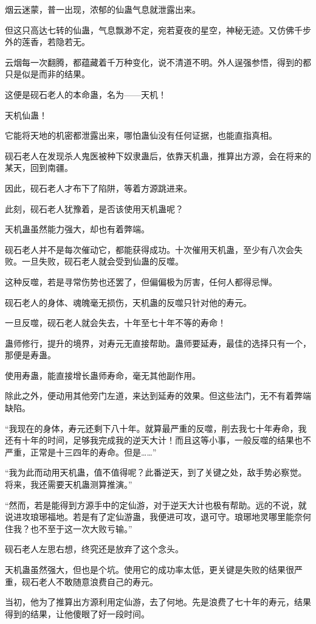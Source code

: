 \begin{this_body}
烟云迷蒙，普一出现，浓郁的仙蛊气息就泄露出来。

但这只高达七转的仙蛊，气息飘渺不定，宛若夏夜的星空，神秘无迹。又仿佛千步外的莲香，若隐若无。

云烟每一次翻腾，都蕴藏着千万种变化，说不清道不明。外人逞强参悟，得到的都只是似是而非的结果。

这便是砚石老人的本命蛊，名为——天机！

天机仙蛊！

它能将天地的机密都泄露出来，哪怕蛊仙没有任何证据，也能直指真相。

砚石老人在发现杀人鬼医被种下奴隶蛊后，依靠天机蛊，推算出方源，会在将来的某天，回到南疆。

因此，砚石老人才布下了陷阱，等着方源跳进来。

此刻，砚石老人犹豫着，是否该使用天机蛊呢？

天机蛊虽然能力强大，却也有着弊端。

砚石老人并不是每次催动它，都能获得成功。十次催用天机蛊，至少有八次会失败。一旦失败，砚石老人就会受到仙蛊的反噬。

这种反噬，若是寻常伤势也还罢了，但偏偏极为厉害，任何人都得忌惮。

砚石老人的身体、魂魄毫无损伤，天机蛊的反噬只针对他的寿元。

一旦反噬，砚石老人就会失去，十年至七十年不等的寿命！

蛊师修行，提升的境界，对寿元无直接帮助。蛊师要延寿，最佳的选择只有一个，那便是寿蛊。

使用寿蛊，能直接增长蛊师寿命，毫无其他副作用。

除此之外，便动用其他旁门左道，来达到延寿的效果。但这些法门，无不有着弊端缺陷。

“我现在的身体，寿元还剩下八十年。就算最严重的反噬，削去我七十年寿命，我还有十年的时间，足够我完成我的逆天大计！而且这等小事，一般反噬的结果也不严重，正常是十三四年的寿命。但是……”

“我为此而动用天机蛊，值不值得呢？此番逆天，到了关键之处，敌手势必察觉。将来，我还需要天机蛊测算推演。”

“然而，若是能得到方源手中的定仙游，对于逆天大计也极有帮助。远的不说，就说进攻琅琊福地。若是有了定仙游蛊，我便进可攻，退可守。琅琊地灵哪里能奈何住我？也不至于这一次大败亏输。”

砚石老人左思右想，终究还是放弃了这个念头。

天机蛊虽然强大，但也是个坑。使用它的成功率太低，更关键是失败的结果很严重，砚石老人不敢随意浪费自己的寿元。

当初，他为了推算出方源利用定仙游，去了何地。先是浪费了七十年的寿元，结果得到的结果，让他傻眼了好一段时间。


\end{this_body}
